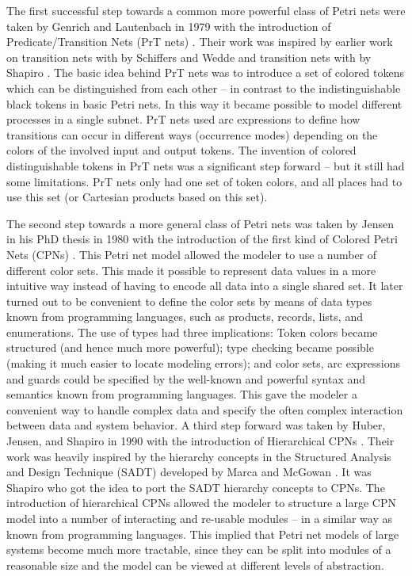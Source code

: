 The first successful step towards a common more powerful class of
Petri nets were taken by Genrich and Lautenbach in 1979 with the
introduction of Predicate/Transition Nets (PrT nets)
\cite{genrich:81}. Their work was inspired by earlier work on
transition nets with  by Schiffers and Wedde
\cite{schiffers:78} and transition nets with  by Shapiro \cite{shapiro:78}. The basic idea behind PrT
nets was to introduce a set of colored tokens which can be
distinguished from each other -- in contrast to the indistinguishable
black tokens in basic Petri nets. In this way it became possible to
model different processes in a single subnet. PrT nets used arc
expressions to define how transitions can occur in different ways
(occurrence modes) depending on the colors of the involved input and
output tokens. The invention of colored distinguishable tokens in PrT
nets was a significant step forward -- but it still had some
limitations. PrT nets only had one set of token colors, and all places
had to use this set (or Cartesian products based on this set).

The second step towards a more general class of Petri nets was taken
by Jensen in his PhD thesis in 1980 with the introduction of the first
kind of Colored Petri Nets (CPNs) \cite{jensen:81}. This Petri net
model allowed the modeler to use a number of different color
sets. This made it possible to represent data values in a more
intuitive way instead of having to encode all data into a single
shared set. It later turned out to be convenient to define the color
sets by means of data types known from programming languages, such as
products, records, lists, and enumerations. The use of types had three
implications: Token colors became structured (and hence much more
powerful); type checking became possible (making it much easier to
locate modeling errors); and color sets, arc expressions and guards
could be specified by the well-known and powerful syntax and semantics
known from programming languages. This gave the modeler a convenient
way to handle complex data and specify the often complex interaction
between data and system behavior. A third step forward was taken by
Huber, Jensen, and Shapiro in 1990 with the introduction of
Hierarchical CPNs \cite{huber:91}. Their work was heavily inspired by
the hierarchy concepts in the Structured Analysis and Design Technique
(SADT) developed by Marca and McGowan \cite{sadt}. It was Shapiro who
got the idea to port the SADT hierarchy concepts to CPNs.  The
introduction of hierarchical CPNs allowed the modeler to structure a
large CPN model into a number of interacting and re-usable modules --
in a similar way as known from programming languages. This implied
that Petri net models of large systems become much more tractable,
since they can be split into modules of a reasonable size and the
model can be viewed at different levels of abstraction.


